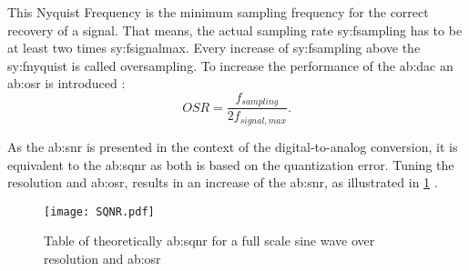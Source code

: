 This Nyquist Frequency is the minimum sampling frequency for the correct recovery of a signal.
That means, the actual sampling rate \gls{sy:fsampling} has to be at least two times \gls{sy:fsignalmax}.
Every increase of \gls{sy:fsampling} above the \gls{sy:fnyquist} is called oversampling.
To increase the performance of the \gls{ab:dac} an \gls{ab:osr} is introduced \cite{DevalRivetVeyrac2015}:
\begin{equation}
OSR = \frac{f_{sampling}}{2 f_{signal,max}}.
\end{equation}

As the \gls{ab:snr} is presented in the context of the digital-to-analog conversion, it is equivalent to the \gls{ab:sqnr} as both is based on the quantization error.
Tuning the resolution and \gls{ab:osr}, results in an increase of the \gls{ab:snr},
as illustrated in \ref{fig:TableSQNR} \cite{DevalRivetVeyrac2015}.

\begin{figure}[ht]
	\centering
  \texttt{[image: SQNR.pdf]}
	\caption{Table of theoretically \gls{ab:sqnr} for a full scale sine wave over resolution and \gls{ab:osr} \cite{DevalRivetVeyrac2015}}
	\label{fig:TableSQNR}
\end{figure}

